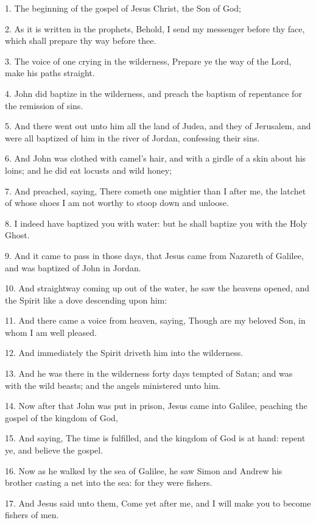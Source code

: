 \setcounter{footnote}{0}

1. The beginning of the gospel of Jesus Christ, the Son of God;

2. As it is written in the prophets, Behold, I send my messenger before thy face,
which shall prepare thy way before thee.

3. The voice of one crying in the wilderness, Prepare ye the way of the Lord, make
his paths straight.

4. John did baptize in the wilderness, and preach the baptism of repentance for
the remission of sins.

5. And there went out unto him all the land of Judea, and they of Jerusalem, and
were all baptized of him in the river of Jordan, confessing their sins.

6. And John was clothed with camel's hair, and with a girdle of a skin about his
loins; and he did eat locusts and wild honey;

7. And preached, saying, There cometh one mightier than I after me, the latchet
of whose shoes I am not worthy to stoop down and unloose.

8. I indeed have baptized you with water: but he shall baptize you with the Holy
Ghost.

9. And it came to pass in those days, that Jesus came from Nazareth of Galilee,
and was baptized of John in Jordan.

10. And straightway coming up out of the water, he saw the heavens opened, and the
Spirit like a dove descending upon him:

11. And there came a voice from heaven, saying, Though are my beloved Son, in whom
I am well pleased.

12. And immediately the Spirit driveth him into the wilderness.

13. And he was there in the wilderness forty days tempted of Satan; and was with
the wild beasts; and the angels ministered unto him.

14. Now after that John was put in prison, Jesus came into Galilee, peaching the
gospel of the kingdom of God,

15. And saying, The time is fulfilled, and the kingdom of God is at hand: repent
ye, and believe the gospel.

16. Now as he walked by the sea of Galilee, he saw Simon and Andrew his brother
casting a net into the sea: for they were fishers.

17. And Jesus said unto them, Come yet after me, and I will make you to become fishers
of men.

